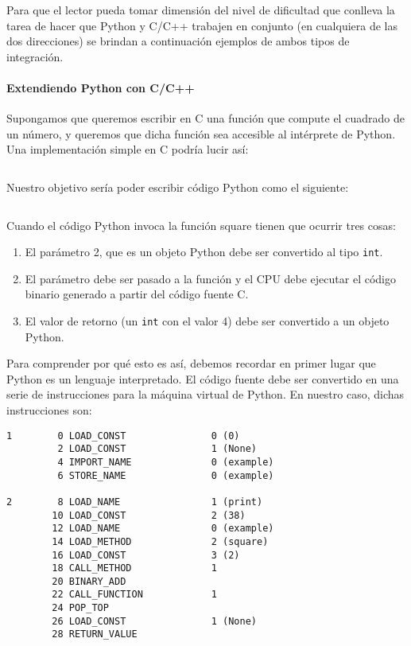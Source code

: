 Para que el lector pueda tomar dimensión del nivel de dificultad que conlleva
la tarea de hacer que Python y C/C++ trabajen en conjunto (en cualquiera de las
dos direcciones) se brindan a continuación ejemplos de ambos tipos de
integración.

\paragraph{Extendiendo Python con C/C++}

Supongamos que queremos escribir en C una función que compute el cuadrado de un
número, y queremos que dicha función sea accesible al intérprete de Python.
Una implementación simple en C podría lucir así:

\inputminted{c}{codelistings/square.cc}

Nuestro objetivo sería poder escribir código Python como el siguiente:

\inputminted{Python}{codelistings/square_usage.py}

Cuando el código Python invoca la función square tienen que ocurrir tres cosas:

\begin{enumerate}
    \item El parámetro 2, que es un objeto Python debe ser convertido al tipo
    \verb!int!.

    \item El parámetro debe ser pasado a la función y el CPU debe ejecutar el
    código binario generado a partir del código fuente C.

    \item El valor de retorno (un \verb!int! con el valor 4) debe ser
    convertido a un objeto Python.
\end{enumerate}

Para comprender por qué esto es así, debemos recordar en primer lugar que
Python es un lenguaje interpretado. El código fuente debe ser convertido en una
serie de instrucciones para la máquina virtual de Python. En nuestro caso,
dichas instrucciones son:

\begin{verbatim}
1        0 LOAD_CONST               0 (0)
         2 LOAD_CONST               1 (None)
         4 IMPORT_NAME              0 (example)
         6 STORE_NAME               0 (example)

2        8 LOAD_NAME                1 (print)
        10 LOAD_CONST               2 (38)
        12 LOAD_NAME                0 (example)
        14 LOAD_METHOD              2 (square)
        16 LOAD_CONST               3 (2)
        18 CALL_METHOD              1
        20 BINARY_ADD
        22 CALL_FUNCTION            1
        24 POP_TOP
        26 LOAD_CONST               1 (None)
        28 RETURN_VALUE
\end{verbatim}

